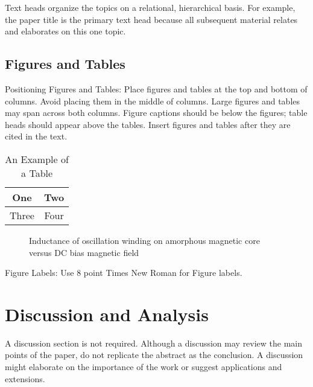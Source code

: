 \documentclass[letterpaper, 10 pt, conference]{ieeeconf}  %
\begin{document}
Text heads organize the topics on a relational, hierarchical basis. For example, the paper title is the primary text head because all subsequent material relates and elaborates on this one topic.

\subsection{Figures and Tables}

Positioning Figures and Tables: Place figures and tables at the top and bottom of columns. Avoid placing them in the middle of columns. Large figures and tables may span across both columns. Figure captions should be below the figures; table heads should appear above the tables. Insert figures and tables after they are cited in the text.

\begin{table}[h]
\caption{An Example of a Table}
\label{table_example}
\begin{center}
\begin{tabular}{|c||c|}
\hline
One & Two\\
\hline
Three & Four\\
\hline
\end{tabular}
\end{center}
\end{table}


   \begin{figure}[thpb]
      \centering
      \caption{Inductance of oscillation winding on amorphous
       magnetic core versus DC bias magnetic field}
      \label{figurelabel}
   \end{figure}
   

Figure Labels: Use 8 point Times New Roman for Figure labels.

\section{Discussion and Analysis}

A discussion section is not required. Although a discussion may review the main points of the paper, do not replicate the abstract as the conclusion. A discussion might elaborate on the importance of the work or suggest applications and extensions.
\end{document}
